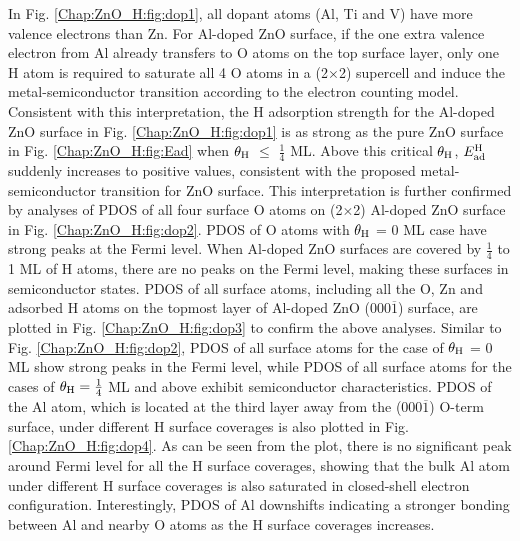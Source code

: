In Fig. \ref{Chap:ZnO_H:fig:dop1}, all dopant atoms (Al, Ti and V) have more valence electrons than Zn. For Al-doped ZnO surface, if the one extra valence electron from Al already transfers to O atoms on the top surface layer, only one H atom is required to saturate all 4 O atoms in a (2$\times$2) supercell and induce the metal-semiconductor transition according to the electron counting model. Consistent with this interpretation, the H adsorption strength for the Al-doped ZnO surface in Fig. \ref{Chap:ZnO_H:fig:dop1} is as strong as the pure ZnO surface in Fig. \ref{Chap:ZnO_H:fig:Ead} when $\theta_{\textup{H}}$ $\leq$ $\frac{1}{4}$ ML. Above this critical $\theta_{\textup{H}}$, $E_{\textup{ad}}^{\textup{H}}$ suddenly increases to positive values, consistent with the proposed metal-semiconductor transition for ZnO surface. This interpretation is further confirmed by analyses of \acf{PDOS} of all four surface O atoms on (2$\times$2) Al-doped ZnO surface in Fig. \ref{Chap:ZnO_H:fig:dop2}. \ac{PDOS} of O atoms with $\theta_{\textup{H}}$ = 0 ML case have strong peaks at the Fermi level. When Al-doped ZnO surfaces are covered by $\frac{1}{4}$ to 1 ML of H atoms, there are no peaks on the Fermi level, making these surfaces in semiconductor states. \ac{PDOS} of all surface atoms, including all the O, Zn and adsorbed H atoms on the topmost layer of Al-doped ZnO (000$\overline{1}$) surface, are plotted in Fig. \ref{Chap:ZnO_H:fig:dop3} to confirm the above analyses. Similar to Fig. \ref{Chap:ZnO_H:fig:dop2},  \ac{PDOS} of all surface atoms for the case of $\theta_{\textup{H}}$ =  0 ML  show strong peaks in the Fermi level, while \ac{PDOS} of all surface atoms for the cases of $\theta_{\textup{H}}=\frac{1}{4}$ ML and above exhibit semiconductor characteristics. \ac{PDOS} of the Al atom, which is located at the third layer away from the (000$\overline{1}$) O-term surface, under different H surface coverages is also plotted in Fig. \ref{Chap:ZnO_H:fig:dop4}.  As can be seen from the plot, there is no significant peak around Fermi level for all the H surface coverages, showing that the bulk Al atom under different H surface coverages is also saturated in closed-shell electron configuration. Interestingly, \ac{PDOS} of Al downshifts indicating a stronger bonding between Al and nearby O atoms as the H surface coverages increases.

